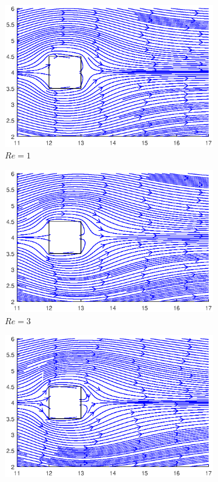 \begin{figure}[h]
	\centering
	\begin{subfigure}{0.5\textwidth}
		\includegraphics[scale=0.61]{Square/1}
		\caption{$Re=1$}
	\end{subfigure}%
	\begin{subfigure}{0.5\textwidth}
		\includegraphics[scale=0.61]{Square/3}
		\caption{$Re=3$}
	\end{subfigure}
	\begin{subfigure}{0.5\textwidth}
		\includegraphics[scale=0.61]{Square/5}

\end{subfigure}
\end{figure}
